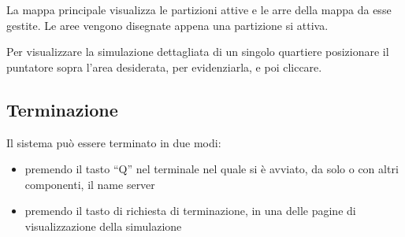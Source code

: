 La mappa principale visualizza le partizioni attive e le arre della mappa da
esse gestite. Le aree vengono disegnate appena una partizione si attiva.

Per visualizzare la simulazione dettagliata di un singolo quartiere posizionare
il puntatore sopra l'area desiderata, per evidenziarla, e poi cliccare.

\subsection{Terminazione}
Il sistema può essere terminato in due modi:
\begin{itemize}
	\item premendo il tasto ``Q'' nel terminale nel quale si è avviato, da solo o
	con altri componenti, il name server
	\item premendo il tasto di richiesta di terminazione, in una delle pagine di
	visualizzazione della simulazione
\end{itemize}
